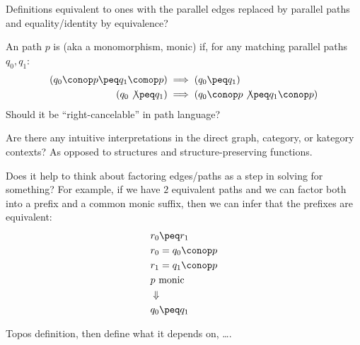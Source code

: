 \documentclass[11pt,openany]{book}
\begin{document}

Definitions equivalent to ones with the parallel
edges replaced by parallel paths and equality/identity 
by equivalence? 

An path $p$ is  (aka a monomorphism, monic)
if, for any matching parallel paths $q_0,q_1$:
\begin{align*}
\left( q_0 \conop p \peq q_1 \comop p \right) 
& 
\implies 
\left( q_0 \peq q_1 \right) 
\\
\left( q_0 \not\peq q_1 \right) 
& \implies 
\left( q_0 \conop p \not\peq q_1 \conop p \right) 
\end{align*}
Should it be ``right-cancelable'' in path language?


Are there any intuitive interpretations in the direct graph,
category, or kategory contexts? As opposed to 
structures and structure-preserving functions.

Does it help to think about factoring edges/paths
as a step in solving for something?
For example, if we have $2$ equivalent paths 
and we can factor both into a prefix and a common monic
suffix, then we can infer that the prefixes are equivalent:
\begin{align*}
& r_0 \peq r_1 \\
& r_0 = q_0 \conop p \\
& r_1 = q_1 \conop p \\
& p \text{ monic } \\
& \Downarrow \\
& q_0 \peq q_1
\end{align*}

\setcounter{currentlevel}{\value{baseSectionLevel}}
\label{sec:Topos-down}
 
Topos definition, then define what it depends on, \ldots.
 
\setcounter{currentlevel}{\value{baseSectionLevel}}
\label{sec:Fusion}
\end{document}
